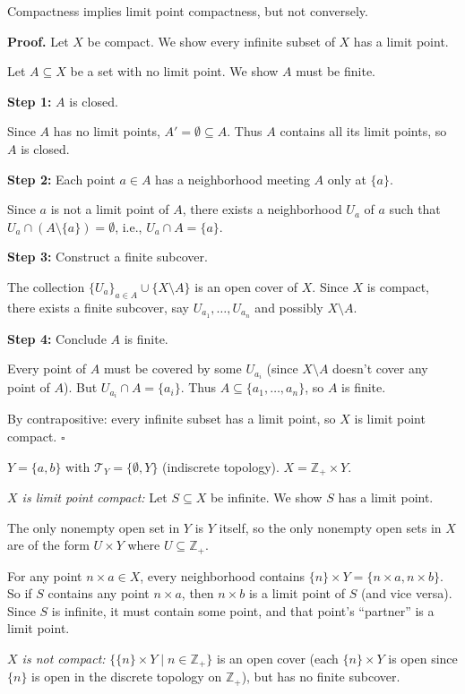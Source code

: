 \documentclass[11pt]{report}
\renewenvironment{proof}[1][Proof]{\noindent\textbf{#1.} }{\hfill$\square$\par\vspace{5pt}}
\begin{document}
\begin{thmbox}
Compactness implies limit point compactness, but not conversely.
\end{thmbox}

\begin{proof}
Let $X$ be compact. We show every infinite subset of $X$ has a limit point.

Let $A \subseteq X$ be a set with no limit point. We show $A$ must be finite.

\textbf{Step 1:} $A$ is closed.

Since $A$ has no limit points, $A' = \emptyset \subseteq A$. Thus $A$ contains all its limit points, so $A$ is closed.

\textbf{Step 2:} Each point $a \in A$ has a neighborhood meeting $A$ only at $\{a\}$.

Since $a$ is not a limit point of $A$, there exists a neighborhood $U_a$ of $a$ such that $U_a \cap (A \setminus \{a\}) = \emptyset$, i.e., $U_a \cap A = \{a\}$.

\textbf{Step 3:} Construct a finite subcover.

The collection $\{U_a\}_{a \in A} \cup \{X \setminus A\}$ is an open cover of $X$. Since $X$ is compact, there exists a finite subcover, say $U_{a_1}, \ldots, U_{a_n}$ and possibly $X \setminus A$.

\textbf{Step 4:} Conclude $A$ is finite.

Every point of $A$ must be covered by some $U_{a_i}$ (since $X \setminus A$ doesn't cover any point of $A$). But $U_{a_i} \cap A = \{a_i\}$. Thus $A \subseteq \{a_1, \ldots, a_n\}$, so $A$ is finite.

By contrapositive: every infinite subset has a limit point, so $X$ is limit point compact.
\end{proof}

\begin{exbox}
$Y = \{a, b\}$ with $\mathcal{T}_Y = \{\emptyset, Y\}$ (indiscrete topology). $X = \mathbb{Z}_+ \times Y$.

\textit{$X$ is limit point compact:} Let $S \subseteq X$ be infinite. We show $S$ has a limit point.

The only nonempty open set in $Y$ is $Y$ itself, so the only nonempty open sets in $X$ are of the form $U \times Y$ where $U \subseteq \mathbb{Z}_+$. 

For any point $n \times a \in X$, every neighborhood contains $\{n\} \times Y = \{n \times a, n \times b\}$. So if $S$ contains any point $n \times a$, then $n \times b$ is a limit point of $S$ (and vice versa). Since $S$ is infinite, it must contain some point, and that point's ``partner'' is a limit point.

\textit{$X$ is not compact:} $\{\{n\} \times Y \mid n \in \mathbb{Z}_+\}$ is an open cover (each $\{n\} \times Y$ is open since $\{n\}$ is open in the discrete topology on $\mathbb{Z}_+$), but has no finite subcover.
\end{exbox}
\end{document}

